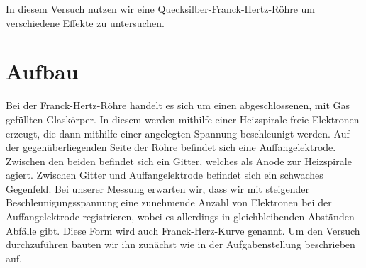 In diesem Versuch nutzen wir eine Quecksilber-Franck-Hertz-Röhre um verschiedene Effekte zu untersuchen.
\section{Aufbau}
Bei der Franck-Hertz-Röhre handelt es sich um einen abgeschlossenen, mit Gas gefüllten Glaskörper. In diesem werden mithilfe einer Heizspirale freie Elektronen erzeugt, die dann mithilfe einer angelegten Spannung beschleunigt werden. Auf der gegenüberliegenden Seite der Röhre befindet sich eine Auffangelektrode. Zwischen den beiden befindet sich ein Gitter, welches als Anode zur Heizspirale agiert. Zwischen Gitter und Auffangelektrode befindet sich ein schwaches Gegenfeld. Bei unserer Messung erwarten wir, dass wir mit steigender Beschleunigungsspannung eine zunehmende Anzahl von Elektronen bei der Auffangelektrode registrieren, wobei es allerdings in gleichbleibenden Abständen Abfälle gibt. Diese Form wird auch Franck-Herz-Kurve genannt. Um den Versuch durchzuführen bauten wir ihn zunächst wie in der Aufgabenstellung beschrieben auf.
